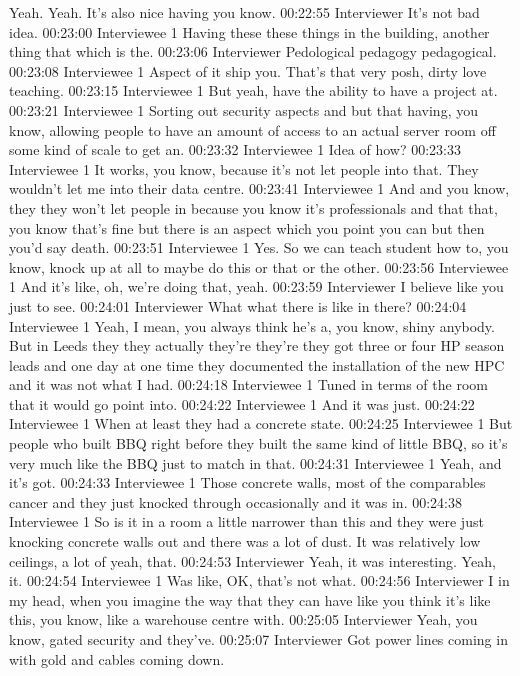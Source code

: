 Yeah. Yeah. It's also nice having you know.
00:22:55 Interviewer
It's not bad idea.
00:23:00 Interviewee 1
Having these these things in the building, another thing that which is the.
00:23:06 Interviewer
Pedological pedagogy pedagogical.
00:23:08 Interviewee 1
Aspect of it ship you. That's that very posh, dirty love teaching.
00:23:15 Interviewee 1
But yeah, have the ability to have a project at.
00:23:21 Interviewee 1
Sorting out security aspects and but that having, you know, allowing people to have an amount of access to an actual server room off some kind of scale to get an.
00:23:32 Interviewee 1
Idea of how?
00:23:33 Interviewee 1
It works, you know, because it's not let people into that. They wouldn't let me into their data centre.
00:23:41 Interviewee 1
And and you know, they they won't let people in because you know it's professionals and that that, you know that's fine but there is an aspect which you point you can but then you'd say death.
00:23:51 Interviewee 1
Yes. So we can teach student how to, you know, knock up at all to maybe do this or that or the other.
00:23:56 Interviewee 1
And it's like, oh, we're doing that, yeah.
00:23:59 Interviewer
I believe like you just to see.
00:24:01 Interviewer
What what there is like in there?
00:24:04 Interviewee 1
Yeah, I mean, you always think he's a, you know, shiny anybody. But in Leeds they they actually they're they're they got three or four HP season leads and one day at one time they documented the installation of the new HPC and it was not what I had.
00:24:18 Interviewee 1
Tuned in terms of the room that it would go point into.
00:24:22 Interviewee 1
And it was just.
00:24:22 Interviewee 1
When at least they had a concrete state.
00:24:25 Interviewee 1
But people who built BBQ right before they built the same kind of little BBQ, so it's very much like the BBQ just to match in that.
00:24:31 Interviewee 1
Yeah, and it's got.
00:24:33 Interviewee 1
Those concrete walls, most of the comparables cancer and they just knocked through occasionally and it was in.
00:24:38 Interviewee 1
So is it in a room a little narrower than this and they were just knocking concrete walls out and there was a lot of dust. It was relatively low ceilings, a lot of yeah, that.
00:24:53 Interviewer
Yeah, it was interesting. Yeah, it.
00:24:54 Interviewee 1
Was like, OK, that's not what.
00:24:56 Interviewer
I in my head, when you imagine the way that they can have like you think it's like this, you know, like a warehouse centre with.
00:25:05 Interviewer
Yeah, you know, gated security and they've.
00:25:07 Interviewer
Got power lines coming in with gold and cables coming down.
